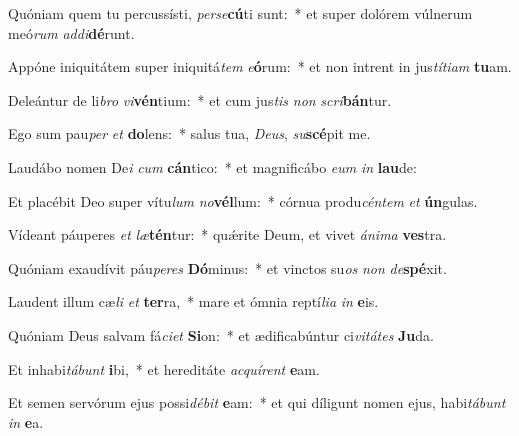 \item Quóniam quem tu percussísti, \textit{per}\textit{se}\textbf{cú}ti sunt:~* et super dolórem vúlnerum meó\textit{rum} \textit{ad}\textit{di}\textbf{dé}runt.
\item Appóne iniquitátem super iniquitá\textit{tem} \textit{e}\textbf{ó}rum:~* et non intrent in jus\textit{tí}\textit{ti}\textit{am} \textbf{tu}am.
\item Deleántur de li\textit{bro} \textit{vi}\textbf{vén}tium:~* et cum jus\textit{tis} \textit{non} \textit{scri}\textbf{bán}tur.
\item Ego sum pau\textit{per} \textit{et} \textbf{do}lens:~* salus tua, \textit{De}\textit{us}, \textit{su}\textbf{scé}pit me.
\item Laudábo nomen De\textit{i} \textit{cum} \textbf{cán}tico:~* et magnificábo \textit{e}\textit{um} \textit{in} \textbf{lau}de:
\item Et placébit Deo super vítu\textit{lum} \textit{no}\textbf{vél}lum:~* córnua produ\textit{cén}\textit{tem} \textit{et} \textbf{ún}gulas.
\item Vídeant páuperes \textit{et} \textit{læ}\textbf{tén}tur:~* quǽrite Deum, et vivet \textit{á}\textit{ni}\textit{ma} \textbf{ves}tra.
\item Quóniam exaudívit páu\textit{pe}\textit{res} \textbf{Dó}minus:~* et vinctos su\textit{os} \textit{non} \textit{de}\textbf{spé}xit.
\item Laudent illum cæ\textit{li} \textit{et} \textbf{ter}ra,~* mare et ómnia reptí\textit{li}\textit{a} \textit{in} \textbf{e}is.
\item Quóniam Deus salvam fá\textit{ci}\textit{et} \textbf{Si}on:~* et ædificabúntur ci\textit{vi}\textit{tá}\textit{tes} \textbf{Ju}da.
\item Et inhabi\textit{tá}\textit{bunt} \textbf{i}bi,~* et hereditáte \textit{ac}\textit{quí}\textit{rent} \textbf{e}am.
\item Et semen servórum ejus possi\textit{dé}\textit{bit} \textbf{e}am:~* et qui díligunt nomen ejus, habi\textit{tá}\textit{bunt} \textit{in} \textbf{e}a.
